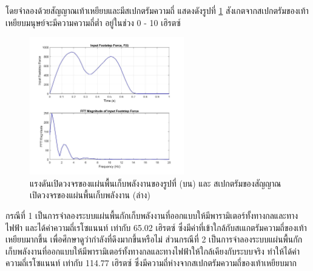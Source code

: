 \documentclass[11pt,a4paper]{article}
\begin{document}
โดยจำลองด้วยสัญญาณเท้าเหยียบและมีสเปกตรัมความถี่ แสดงดังรูปที่ \ref{spectrum_foot_step} สังเกตจากสเปกตรัมของเท้าเหยียบมนุษย์จะมีความความถี่ต่ำ อยู่ในช่วง 0 - 10 เฮิรตซ์ 
\begin{figure}[H]
    \begin{center}
        \includegraphics[width=0.6\textwidth]{spectrum_foot_step.jpg}
    \end{center}
    \caption{แรงดันเปิดวงจรของแผ่นพื้นเก็บพลังงานของรูปที่ (บน) และ สเปกตรัมของสัญญาณเปิดวงจรของแผ่นพื้นเก็บพลังงาน (ล่าง)}
    \label{spectrum_foot_step}
\end{figure}

กรณีที่ 1 เป็นการจำลองระบบแผ่นพื้นกักเก็บพลังงานที่ออกแบบให้มีพารามิเตอร์ทั้งทางกลและทางไฟฟ้า และได้ค่าความถี่เรโซแนนท์ เท่ากับ 65.02 เฮิรตซ์ ซึ่งมีค่าที่เข้าใกล้กับสเแกตรัมความถี่ของเท้าเหยียบมากขึ้น เพื่อศึกษาดูว่ากำลังที่ดึงมากขึ้นหรือไม่
ส่วนกรณีที่ 2 เป็นการจำลองระบบแผ่นพื้นกักเก็บพลังงานที่ออกแบบให้มีพารามิเตอร์ทั้งทางกลและทางไฟฟ้าให้ใกล้เคียงกับระบบจริง ทำให้ได้ค่าความถี่เรโซแนนท์ เท่ากับ 114.77 เฮิรตซ์ ซึ่งมีความถี่ห่างจากสเปกตรัมความถี่ของเท้าเหยียบมาก
\end{document}
